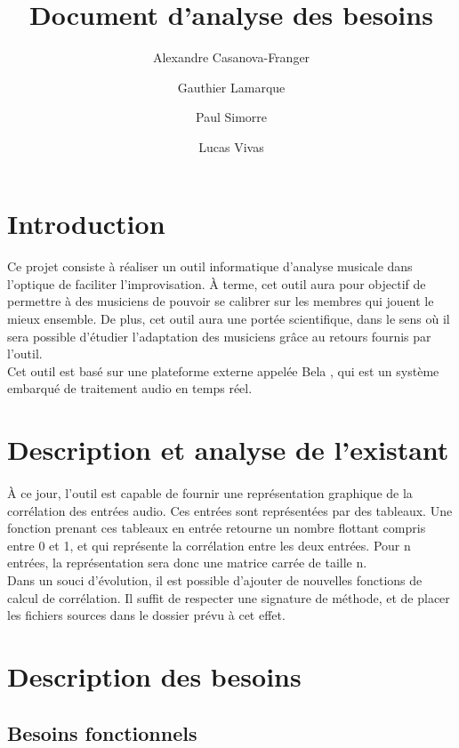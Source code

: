 \documentclass{article}
\title{Document d'analyse des besoins}
\author{Alexandre Casanova-Franger\\
        \and
        Gauthier Lamarque\\
        \and
        Paul Simorre\\
        \and
        Lucas Vivas\\}
\begin{document}
  \maketitle
  \section{Introduction}
    \paragraph{}
    Ce projet consiste à réaliser un outil informatique d'analyse musicale dans
    l'optique de faciliter l'improvisation. À terme, cet outil aura pour
    objectif de permettre à des musiciens de pouvoir se calibrer sur les membres
    qui jouent le mieux ensemble. De plus, cet outil aura une portée
    scientifique, dans le sens où il sera possible d'étudier l'adaptation des
    musiciens grâce au retours fournis par l'outil. \\
    Cet outil est basé sur une plateforme externe appelée Bela \cite{BELA}, qui
    est un système embarqué de traitement audio en temps réel.
  \section{Description et analyse de l'existant}
    \paragraph{}
    À ce jour, l'outil est capable de fournir une représentation graphique de la
    corrélation des entrées audio. Ces entrées sont représentées par des
    tableaux. Une fonction prenant ces tableaux en entrée
    retourne un nombre flottant compris entre 0 et 1, et qui représente la
    corrélation entre les deux entrées. Pour n entrées, la représentation sera
    donc une matrice carrée de taille n.\\
    Dans un souci d'évolution, il est possible d'ajouter de nouvelles fonctions
    de calcul de corrélation. Il suffit de respecter une signature de méthode,
    et de placer les fichiers sources dans le dossier prévu à cet effet.\\
  \section{Description des besoins}
    \subsection{Besoins fonctionnels}
\end{document}
